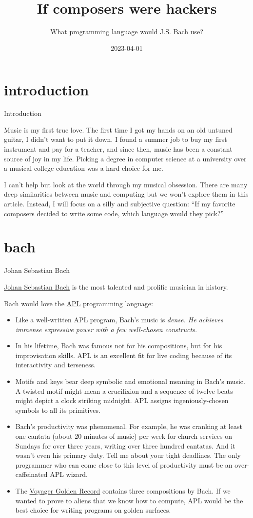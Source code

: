 \documentclass{article}
\title{If composers were hackers}
\subtitle{What programming language would J.S. Bach use?}
\date{2023-04-01}
\begin{document}
\section{introduction}{Introduction}

Music is my first true love.
The first time I got my hands on an old untuned guitar, I didn't want to put it down.
I found a summer job to buy my first instrument and pay for a teacher, and since then, music has been a constant source of joy in my life.
Picking a degree in computer science at a university over a musical college education was a hard choice for me.

I can't help but look at the world through my musical obsession.
There are many deep similarities between music and computing but we won't explore them in this article.
Instead, I will focus on a silly and subjective question: ``If my favorite composers decided to write some code, which language would they pick?''

\section{bach}{Johan Sebastian Bach}

\href{https://en.wikipedia.org/wiki/Johann_Sebastian_Bach}{Johan Sebastian Bach} is the most talented and prolific musician in history.

Bach would love the \href{https://en.wikipedia.org/wiki/APL_(programming_language)}{APL} programming language:

\begin{itemize}
  \item
    Like a well-written APL program, Bach's music is \em{dense}.
    He achieves immense expressive power with a few well-chosen constructs.
  \item
    In his lifetime, Bach was famous not for his compositions, but for his improvisation skills.
    APL is an excellent fit for live coding because of its interactivity and terseness.
  \item
    Motifs and keys bear deep symbolic and emotional meaning in Bach's music.
    A twisted motif might mean a crucifixion and a sequence of twelve beats might depict a clock striking midnight.
    APL assigns ingeniously-chosen symbols to all its primitives.
  \item
    Bach's productivity was phenomenal.
    For example, he was cranking at least one cantata (about 20 minutes of music) per week for church services on Sundays for over three years, writing over three hundred cantatas.
    And it wasn't even his primary duty.
    Tell me about your tight deadlines.
    The only programmer who can come close to this level of productivity must be an over-caffeinated APL wizard.
  \item
    The \href{https://en.wikipedia.org/wiki/Contents_of_the_Voyager_Golden_Record}{Voyager Golden Record} contains three compositions by Bach.
    If we wanted to prove to aliens that we know how to compute, APL would be the best choice for writing programs on golden surfaces.
\end{itemize}
\end{document}
